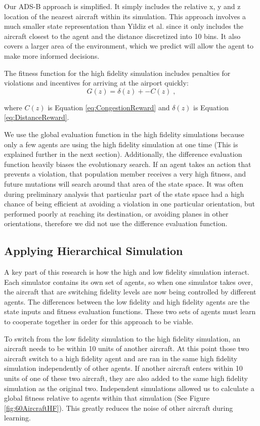 \documentclass{aamas2014}
\begin{document}
Our ADS-B approach is simplified. It simply includes the relative x, y and z location of the nearest aircraft within its simulation. This approach involves a much smaller state representation than Yildiz et al. since it only includes the aircraft closest to the agent and the distance discretized into 10 bins. It also covers a larger area of the environment, which we predict will allow the agent to make more informed decisions.

The fitness function for the high fidelity simulation includes penalties for violations and incentives for arriving at the airport quickly:
%
\begin{equation} \label{eq:Global-HighFid}
G(z) = \delta(z) + -C(z)\;,
\end{equation}

where $C(z)$ is Equation \ref{eq:CongestionReward} and $\delta(z)$ is Equation \ref{eq:DistanceReward}.

We use the global evaluation function in the high fidelity simulations because only a few agents are using the high fidelity simulation at one time (This is explained further in the next section). Additionally, the difference evaluation function heavily biases the evolutionary search. If an agent takes an action that prevents a violation, that population member receives a very high fitness, and future mutations will search around that area of the state space. It was often during preliminary analysis that particular part of the state space had a high chance of being efficient at avoiding a violation in one particular orientation, but performed poorly at reaching its destination, or avoiding planes in other orientations, therefore we did not use the difference evaluation function.

\subsection{Applying Hierarchical Simulation}
A key part of this research is how the high and low fidelity simulation interact. Each simulator contains its own set of agents, so when one simulator takes over, the aircraft that are switching fidelity levels are now being controlled by different agents. The differences between the low fidelity and high fidelity agents are the state inputs and fitness evaluation functions. These two sets of agents must learn to cooperate together in order for this approach to be viable. 

To switch from the low fidelity simulation to the high fidelity simulation, an aircraft needs to be within 10 units of another aircraft. At this point those two aircraft switch to a high fidelity agent and are ran in the same high fidelity simulation independently of other agents. If another aircraft enters within 10 units of one of these two aircraft, they are also added to the same high fidelity simulation as the original two. Independent simulations allowed us to calculate a global fitness relative to agents within that simulation (See Figure \ref{fig:60AircraftHF}). This greatly reduces the noise of other aircraft during learning.
\end{document}
